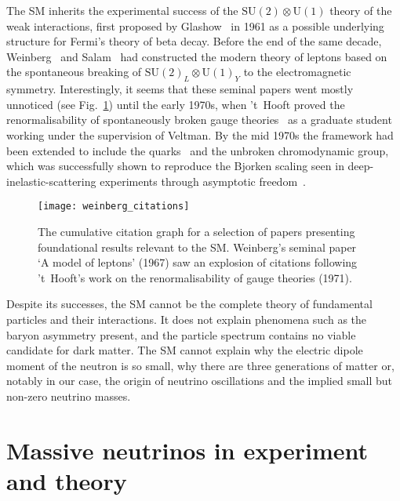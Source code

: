 The SM inherits the experimental success of the
$\mathrm{SU}(2) \otimes \mathrm{U}(1)$ theory of the weak interactions, first
proposed by Glashow~\cite{Glashow:1961tr} in 1961 as a possible underlying
structure for Fermi's theory of beta decay. Before the end of the same decade,
Weinberg~\cite{Weinberg:1967tq} and Salam~\cite{Salam:1968rm} had constructed
the modern theory of leptons based on the spontaneous breaking of
$\mathrm{SU}(2)_{L} \otimes \mathrm{U}(1)_{Y}$ to the electromagnetic symmetry.
Interestingly, it seems that these seminal papers went mostly unnoticed (see
Fig.~\ref{fig:ch1-weinberg-citations}) until the early 1970s, when 't~Hooft proved
the renormalisability of spontaneously broken gauge
theories~\cite{tHooft:1971akt} as a graduate student working under the
supervision of Veltman. By the mid 1970s the framework had been extended to
include the quarks~\cite{Glashow:1970gm} and the unbroken chromodynamic group,
which was successfully shown to reproduce the Bjorken scaling seen in
deep-inelastic-scattering experiments through asymptotic
freedom~\cite{Gross:1973id}.
\begin{figure}[t]
  \centering
  \texttt{[image: weinberg\_citations]}
  \caption[The cumulative citation graph for a selection of papers presenting
  foundational results relevant to the SM.]{The cumulative citation graph for a
    selection of papers presenting foundational results relevant to the SM.
    Weinberg's seminal paper `A model of leptons' (1967) saw an explosion of
    citations following 't~Hooft's work on the renormalisability of gauge
    theories (1971).}
  \label{fig:ch1-weinberg-citations}
\end{figure}

Despite its successes, the SM cannot be the complete theory of fundamental
particles and their interactions. It does not explain phenomena such as the
baryon asymmetry present, and the particle spectrum contains no viable candidate
for dark matter. The SM cannot explain why the electric dipole moment of the
neutron is so small, why there are three generations of matter or, notably in
our case, the origin of neutrino oscillations and the implied small but non-zero
neutrino masses.

\section{Massive neutrinos in experiment and theory}

